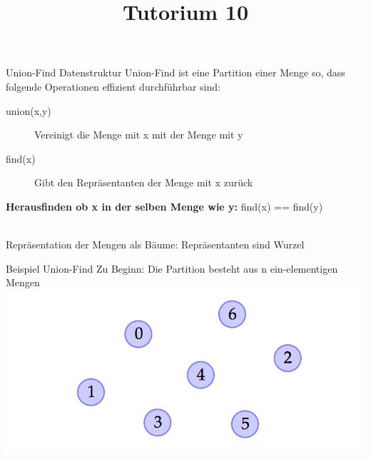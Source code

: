 
\title[Algorithmen I SS 14]{Tutorium 10}

\usepackage{alltt}





\begin{frame}
  \maketitle
\end{frame}

\begin{frame}{Union-Find Datenstruktur}
	Union-Find ist eine Partition einer Menge so, dass folgende Operationen effizient durchführbar sind:
	\begin{description}
		\item[union(x,y)] Vereinigt die Menge mit x mit der Menge mit y 
		\item[find(x)] Gibt den Repräsentanten der Menge mit x zurück
	\end{description}

	\textbf{Herausfinden ob x in der selben Menge wie y:} find(x) == find(y)

	\ \\
	Repräsentation der Mengen als Bäume: Repräsentanten sind Wurzel
\end{frame}

\begin{frame}{Beispiel Union-Find}
	Zu Beginn: Die Partition besteht aus n ein-elementigen Mengen
	\includegraphics[width=\textwidth]{images/uf01}
	
\end{frame}

